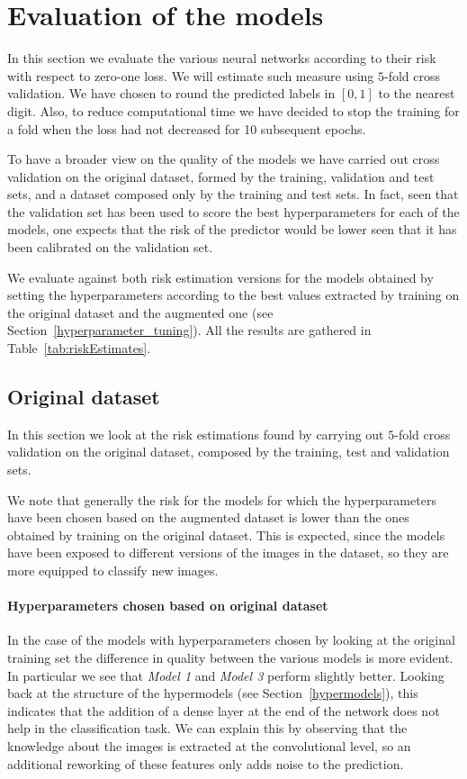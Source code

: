 \section{Evaluation of the models}\label{3_evaluation}
In this section we evaluate the various neural networks according to their risk with respect to zero-one loss. We will estimate such measure using $5$-fold cross validation. We have chosen to round the predicted labels in $\left[0,1\right]$ to the nearest digit. Also, to reduce computational time we have decided to stop the training for a fold when the loss had not decreased for 10 subsequent epochs. 

To have a broader view on the quality of the models we have carried out cross validation on the original dataset, formed by the training, validation and test sets, and a dataset composed only by the training and test sets. In fact, seen that the validation set has been used to score the best hyperparameters for each of the models, one expects that the risk of the predictor would be lower seen that it has been calibrated on the validation set. 

We evaluate against both risk estimation versions for the models obtained by setting the hyperparameters according to the best values extracted by training on the original dataset and the augmented one (see Section~\ref{hyperparameter_tuning}). All the results are gathered in Table~\ref{tab:riskEstimates}.



\subsection{Original dataset}\label{evaluation_originalDataset}
In this section we look at the risk estimations found by carrying out $5$-fold cross validation on the original dataset, composed by the training, test and validation sets. 

We note that generally the risk for the models for which the hyperparameters have been chosen based on the augmented dataset is lower than the ones obtained by training on the original dataset. This is expected, since the models have been exposed to different versions of the images in the dataset, so they are more equipped to classify new images.

\paragraph{Hyperparameters chosen based on original dataset}
In the case of the models with hyperparameters chosen by looking at the original training set the difference in quality between the various models is more evident. In particular we see that \textsl{Model 1} and \textsl{Model 3} perform slightly better. Looking back at the structure of the hypermodels (see Section~\ref{hypermodels}), this indicates that the addition of a dense layer at the end of the network does not help in the classification task. We can explain this by observing that the knowledge about the images is extracted at the convolutional level, so an additional reworking of these features only adds noise to the prediction.

